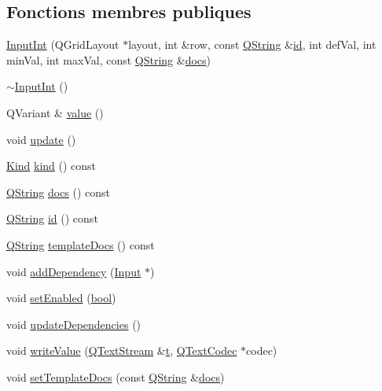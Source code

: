 \subsection*{Fonctions membres publiques}
\begin{DoxyCompactItemize}
\item 
\hyperlink{class_input_int_a7fc610d2f758d87739ecb8aad47cd39e}{Input\+Int} (Q\+Grid\+Layout $\ast$layout, int \&row, const \hyperlink{class_q_string}{Q\+String} \&\hyperlink{class_input_int_a97c8bc657f2e6476264a5a6c0cbafb66}{id}, int def\+Val, int min\+Val, int max\+Val, const \hyperlink{class_q_string}{Q\+String} \&\hyperlink{class_input_int_ac7adddde8113cfe304612caf4a38eb53}{docs})
\item 
\hyperlink{class_input_int_ae44a50bba96d652a191c29eda2c10e0e}{$\sim$\+Input\+Int} ()
\item 
Q\+Variant \& \hyperlink{class_input_int_a7fe2f461003ff32c996a2aeb9ee07384}{value} ()
\item 
void \hyperlink{class_input_int_a9e800d343da95c2df7fb768e20c9a112}{update} ()
\item 
\hyperlink{class_input_a4138334795f6330759839617744e20a9}{Kind} \hyperlink{class_input_int_a1a2b43b9021875569032d4574a9bb53b}{kind} () const 
\item 
\hyperlink{class_q_string}{Q\+String} \hyperlink{class_input_int_ac7adddde8113cfe304612caf4a38eb53}{docs} () const 
\item 
\hyperlink{class_q_string}{Q\+String} \hyperlink{class_input_int_a97c8bc657f2e6476264a5a6c0cbafb66}{id} () const 
\item 
\hyperlink{class_q_string}{Q\+String} \hyperlink{class_input_int_a13208cb8140282b89b249e6f926ae3b9}{template\+Docs} () const 
\item 
void \hyperlink{class_input_int_af87701d09b1c6c53122857cf06f3ac9f}{add\+Dependency} (\hyperlink{class_input}{Input} $\ast$)
\item 
void \hyperlink{class_input_int_a0ac54eacde8aaf5b63b61f3ad1552cca}{set\+Enabled} (\hyperlink{qglobal_8h_a1062901a7428fdd9c7f180f5e01ea056}{bool})
\item 
void \hyperlink{class_input_int_a74643e6c6b576950df380fb21a7de54a}{update\+Dependencies} ()
\item 
void \hyperlink{class_input_int_a2920733e59e4716c8fd0e5e9adf67ba1}{write\+Value} (\hyperlink{class_q_text_stream}{Q\+Text\+Stream} \&\hyperlink{058__bracket__recursion_8tcl_a69e959f6901827e4d8271aeaa5fba0fc}{t}, \hyperlink{class_q_text_codec}{Q\+Text\+Codec} $\ast$codec)
\item 
void \hyperlink{class_input_int_ad4f9a0ed2073110852122054cc03c774}{set\+Template\+Docs} (const \hyperlink{class_q_string}{Q\+String} \&\hyperlink{class_input_int_ac7adddde8113cfe304612caf4a38eb53}{docs})
\end{DoxyCompactItemize}

